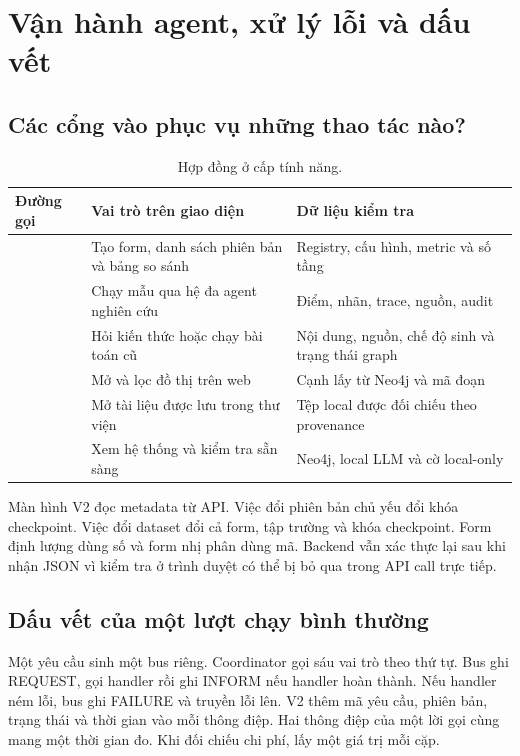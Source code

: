 \chapter{Vận hành agent, xử lý lỗi và dấu vết}\label{pr:failure}

\section{Các cổng vào phục vụ những thao tác nào?}
\begin{table}[H]\centering\small{}
\caption{Hợp đồng ở cấp tính năng.}
\begin{tabular}{P{4.1cm}P{5.4cm}P{4.7cm}}\toprule
Đường gọi & Vai trò trên giao diện & Dữ liệu kiểm tra\\\midrule
{} & Tạo form, danh sách phiên bản và bảng so sánh & Registry, cấu hình, metric và số tầng\\
 & Chạy mẫu qua hệ đa agent nghiên cứu & Điểm, nhãn, trace, nguồn, audit\\
 & Hỏi kiến thức hoặc chạy bài toán cũ & Nội dung, nguồn, chế độ sinh và trạng thái graph\\
 & Mở và lọc đồ thị trên web & Cạnh lấy từ Neo4j và mã đoạn\\
 & Mở tài liệu được lưu trong thư viện & Tệp local được đối chiếu theo provenance\\
 & Xem hệ thống và kiểm tra sẵn sàng & Neo4j, local LLM và cờ local-only\\\bottomrule
\end{tabular}
\end{table}

Màn hình V2 đọc metadata từ API. Việc đổi phiên bản chủ yếu đổi khóa checkpoint. Việc đổi dataset đổi cả form, tập trường và khóa checkpoint. Form định lượng dùng số và form nhị phân dùng mã. Backend vẫn xác thực lại sau khi nhận JSON vì kiểm tra ở trình duyệt có thể bị bỏ qua trong API call trực tiếp.

\section{Dấu vết của một lượt chạy bình thường}
Một yêu cầu sinh một bus riêng. Coordinator gọi sáu vai trò theo thứ tự. Bus ghi REQUEST, gọi handler rồi ghi INFORM nếu handler hoàn thành. Nếu handler ném lỗi, bus ghi FAILURE và truyền lỗi lên. V2 thêm mã yêu cầu, phiên bản, trạng thái và thời gian vào mỗi thông điệp. Hai thông điệp của một lời gọi cùng mang một thời gian đo. Khi đối chiếu chi phí, lấy một giá trị mỗi cặp.

